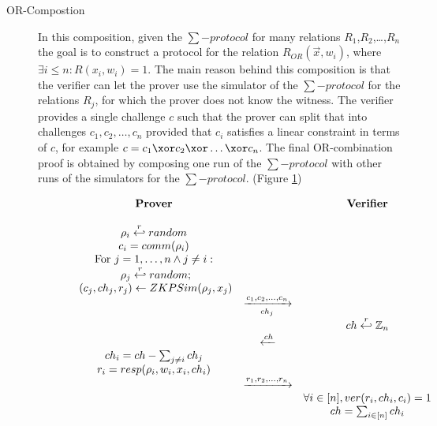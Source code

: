 \begin{description}
\item[OR-Compostion] In this composition, given the $\sum-protocol$ for many  
  relations $R_{1}$,$R_{2}$,\dots,\(R_{n}\) the goal is to construct a protocol for the
  relation
  $R_{OR}(\vec{x}, w_{i}) $, where \(\exists i \leq n: R(x_{i},w_{i}) = 1\). The main reason behind this composition is that the verifier
  can let the prover use the simulator of the \(\sum-protocol\) for the
  relations \(R_{j}\), for which the prover does not know the witness.
  The verifier provides a single challenge \(c\)
  such that the prover can split that into challenges \(c_{1}, c_{2}, \dots, c_{n}\)
  provided that \(c_{i}\) satisfies a linear constraint in terms of \(c\),
  for example \(c = c_{1} \xor c_{2} \xor \dots \xor c_{n}\). The final OR-combination proof is
  obtained by composing one run of the \(\sum-protocol\) with other runs of the
  simulators for the \(\sum-protocol\). (Figure \ref{fig:OR-Combination})
  \begin{figure}[h!]
    \centering
    \begin{equation*}
      \begin{array}{c c c}
        \text{\textbf{Prover}} & & \text{\textbf{Verifier}} \\
        \\
        \rho_{i} \stackrel{r}{\hookleftarrow} random & & \\
        c_{i} = comm(\rho_{i}) & & \\
        \text{For } j = 1,\dots,n \wedge j \neq i: & & \\
        \text{    } \rho_{j} \stackrel{r}{\hookleftarrow} random; & & \\
        \text{    } (c_{j}, ch_{j}, r_{j}) \gets ZKPSim(\rho_{j}, x_{j}) & & \\
                               & \xrightarrow[ch_{j}]{c_{1}, c_{2}, \dots, c_{n}} & \\
                               & & ch \stackrel{r}{\hookleftarrow} \mathbb{Z}_{n} \\
                               & \xleftarrow{ch} & \\
        ch_{i} = ch - \sum_{j \neq i}{ch_{j}} & & \\
        r_{i} = resp(\rho_{i}, w_{i}, x_{i}, ch_{i}) & & \\
                               & \xrightarrow{r_{1}, r_{2}, \dots, r_{n}} & \\
                               & & \forall i \in [n], ver(r_{i}, ch_{i}, c_{i}) = 1 \\
                               & & ch = \sum_{i \in [n]}ch_{i}\\
      \end{array}
    \end{equation*}
    \caption{}
    \label{fig:OR-Combination}
  \end{figure}
\end{description}



